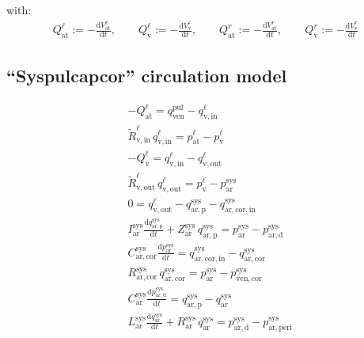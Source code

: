 \documentclass[a4paper,12pt]{report}
\begin{document}
with:
\begin{align}
Q_{\mathrm{at}}^{\ell} := -\frac{\mathrm{d}V_{\mathrm{at}}^{\ell}}{\mathrm{d}t}, \qquad
Q_{\mathrm{v}}^{\ell} := -\frac{\mathrm{d}V_{\mathrm{v}}^{\ell}}{\mathrm{d}t}, \qquad
Q_{\mathrm{at}}^{r} := -\frac{\mathrm{d}V_{\mathrm{at}}^{r}}{\mathrm{d}t}, \qquad
Q_{\mathrm{v}}^{r} := -\frac{\mathrm{d}V_{\mathrm{v}}^{r}}{\mathrm{d}t}\nonumber
\end{align}



\subsection{``Syspulcapcor'' circulation model}

\begin{align}
&-Q_{\mathrm{at}}^{\ell} = q_{\mathrm{ven}}^{\mathrm{pul}} - q_{\mathrm{v,in}}^{\ell}\nonumber\\
&\tilde{R}_{\mathrm{v,in}}^{\ell}\,q_{\mathrm{v,in}}^{\ell} = p_{\mathrm{at}}^{\ell}-p_{\mathrm{v}}^{\ell}\nonumber\\
&-Q_{\mathrm{v}}^{\ell} = q_{\mathrm{v,in}}^{\ell} - q_{\mathrm{v,out}}^{\ell}\nonumber\\
&\tilde{R}_{\mathrm{v,out}}^{\ell}\,q_{\mathrm{v,out}}^{\ell} = p_{\mathrm{v}}^{\ell}-p_{\mathrm{ar}}^{\mathrm{sys}}\nonumber\\
&0 = q_{\mathrm{v,out}}^{\ell} - q_{\mathrm{ar,p}}^{\mathrm{sys}} - q_{\mathrm{ar,cor,in}}^{\mathrm{sys}}\nonumber\\
&I_{\mathrm{ar}}^{\mathrm{sys}} \frac{\mathrm{d}q_{\mathrm{ar,p}}^{\mathrm{sys}}}{\mathrm{d}t} + Z_{\mathrm{ar}}^{\mathrm{sys}}\,q_{\mathrm{ar,p}}^{\mathrm{sys}}=p_{\mathrm{ar}}^{\mathrm{sys}}-p_{\mathrm{ar,d}}^{\mathrm{sys}}\nonumber\\
&C_{\mathrm{ar,cor}}^{\mathrm{sys}} \frac{\mathrm{d}p_{\mathrm{ar}}^{\mathrm{sys}}}{\mathrm{d}t} = q_{\mathrm{ar,cor,in}}^{\mathrm{sys}} - q_{\mathrm{ar,cor}}^{\mathrm{sys}}\nonumber\\
&R_{\mathrm{ar,cor}}^{\mathrm{sys}}\,q_{\mathrm{ar,cor}}^{\mathrm{sys}} = p_{\mathrm{ar}}^{\mathrm{sys}} - p_{\mathrm{ven,cor}}^{\mathrm{sys}}\nonumber\\
&C_{\mathrm{ar}}^{\mathrm{sys}} \frac{\mathrm{d}p_{\mathrm{ar,d}}^{\mathrm{sys}}}{\mathrm{d}t} = q_{\mathrm{ar,p}}^{\mathrm{sys}} - q_{\mathrm{ar}}^{\mathrm{sys}}\nonumber\\
&L_{\mathrm{ar}}^{\mathrm{sys}}\frac{\mathrm{d}q_{\mathrm{ar}}^{\mathrm{sys}}}{\mathrm{d}t} + R_{\mathrm{ar}}^{\mathrm{sys}}\,q_{\mathrm{ar}}^{\mathrm{sys}}=p_{\mathrm{ar,d}}^{\mathrm{sys}} -p_{\mathrm{ar,peri}}^{\mathrm{sys}}\nonumber\\

\end{align}
\end{document}
